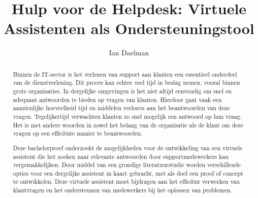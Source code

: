 \documentclass{hogent-article}
\title{Hulp voor de Helpdesk: Virtuele Assistenten als Ondersteuningstool}
\author{Ian Daelman}
\begin{document}
\begin{abstract}
  
    Binnen de IT-sector is het verlenen van support aan klanten een essentieel onderdeel van de dienstverlening. Dit proces kan echter veel tijd in beslag nemen, vooral binnen grote organisaties. In dergelijke omgevingen is het niet altijd eenvoudig om snel en adequaat antwoorden te bieden op vragen van klanten. Hierdoor gaat vaak een aanzienlijke hoeveelheid tijd en middelen verloren aan het beantwoorden van deze vragen. Tegelijkertijd verwachten klanten zo snel mogelijk een antwoord op hun vraag. Het is met andere woorden in zowel het belang van de organisatie als de klant om deze vragen op een efficiënte manier te beantwoorden.
    
    Deze bachelorproef onderzoekt de mogelijkheden voor de ontwikkeling van een virtuele assistent die het zoeken naar relevante antwoorden door supportmedewerkers kan vergemakkelijken. Door middel van een grondige literatuurstudie worden verschillende opties voor een dergelijke assistent in kaart gebracht, met als doel een proof of concept te ontwikkelen. Deze virtuele assistent moet bijdragen aan het efficiënt verwerken van klantvragen en het ondersteunen van medewerkers bij het oplossen van problemen.
  
 
\end{abstract}

\tableofcontents



\printbibliography[heading=bibintoc]
\end{document}
